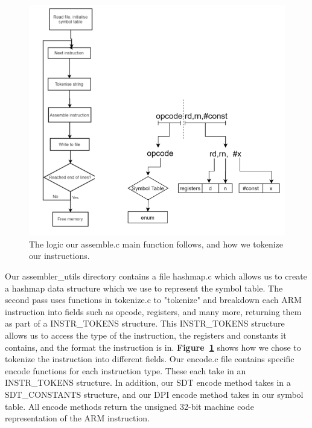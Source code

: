 \documentclass[11pt]{article}
\begin{document}
\begin{figure}[ht]
    \centering
    \includegraphics[scale = 0.6]{assembleMainAndInstructionTokens.png}
    \caption{The logic our assemble.c main function follows, and how we tokenize our instructions.}
    \label{fig:assemblemainandtokenize}
\end{figure}

Our assembler\_utils directory contains a file hashmap.c which allows us to create a hashmap data structure which we use to represent the symbol table. The second pass uses functions in tokenize.c to "tokenize" and breakdown each ARM instruction into fields such as opcode, registers, and many more, returning them as part of a INSTR\_TOKENS structure. This INSTR\_TOKENS structure allows us to access the type of the instruction, the registers and constants it contains, and the format the instruction is in. \textbf{Figure~\ref{fig:assemblemainandtokenize}} shows how we chose to tokenize the instruction into different fields. Our encode.c file contains specific encode functions for each instruction type. These each take in an INSTR\_TOKENS structure. In addition, our SDT encode method takes in a SDT\_CONSTANTS structure, and our DPI encode method takes in our symbol table. All encode methods return the unsigned 32-bit machine code representation of the ARM instruction. 
\end{document}
